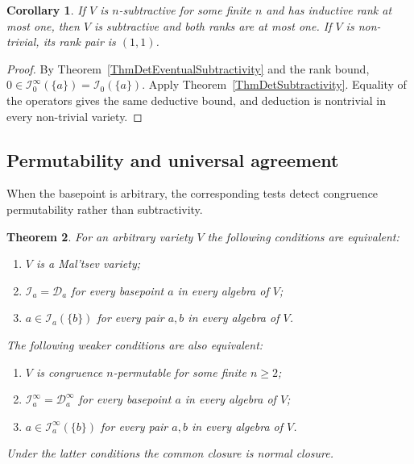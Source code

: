 \documentclass[12pt,english]{amsart}
\newtheorem{theorem}{Theorem}[section]
\newtheorem{corollary}[theorem]{Corollary}
\theoremstyle{definition}
\numberwithin{equation}{section}
\theoremstyle{remark}
\begin{document}
\begin{corollary}\label{CorDetSubtractiveRankOne}
If $V$ is $n$-subtractive for some finite $n$ and has inductive
rank at most one, then $V$ is subtractive and both ranks are at
most one. If $V$ is non-trivial, its rank pair is $(1,1)$.
\end{corollary}

\begin{proof}
By Theorem~\ref{ThmDetEventualSubtractivity} and the rank bound,
$0\in\mathcal I_0^\infty(\{a\})=\mathcal I_0(\{a\})$.
Apply Theorem~\ref{ThmDetSubtractivity}. Equality of the operators
gives the same deductive bound, and deduction is nontrivial in
every non-trivial variety.
\end{proof}

\subsection{Permutability and universal agreement}
\label{SubsecDetPermutability}

When the basepoint is arbitrary, the corresponding tests detect
congruence permutability rather than subtractivity.

\begin{theorem}\label{ThmDetUniversalAgreement}
For an arbitrary variety $V$ the following conditions are equivalent:
\begin{enumerate}
\item $V$ is a Mal'tsev variety;
\item $\mathcal I_a=\mathcal D_a$ for every basepoint $a$ in every
      algebra of $V$;
\item $a\in\mathcal I_a(\{b\})$ for every pair $a,b$ in every
      algebra of $V$.
\end{enumerate}
The following weaker conditions are also equivalent:
\begin{enumerate}[label=(\roman*)]
\item $V$ is congruence $n$-permutable for some finite $n\geqslant2$;
\item $\mathcal I_a^\infty=\mathcal D_a^\infty$ for every
      basepoint $a$ in every algebra of $V$;
\item $a\in\mathcal I_a^\infty(\{b\})$ for every pair $a,b$ in
      every algebra of $V$.
\end{enumerate}
Under the latter conditions the common closure is normal closure.
\end{theorem}
\end{document}
